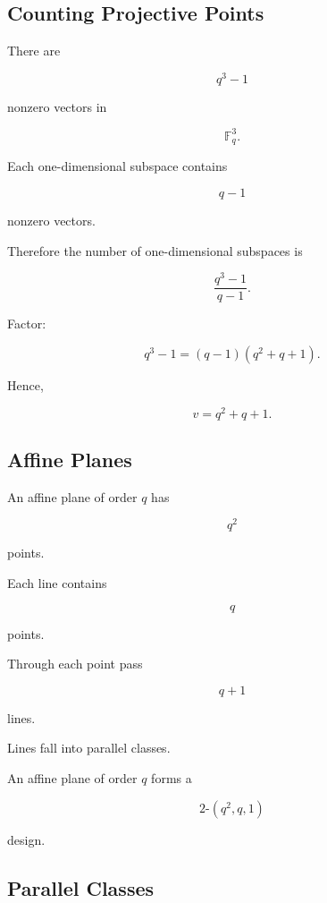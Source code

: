 \subsection{Counting Projective Points}
\label{subsec:counting-projective-points}

There are

\[
q^3-1
\]

nonzero vectors in

\[
\mathbb{F}_q^3.
\]

Each one-dimensional subspace contains

\[
q-1
\]

nonzero vectors.

Therefore the number of one-dimensional subspaces is

\[
\frac{q^3-1}{q-1}.
\]

Factor:

\[
q^3-1
=
(q-1)(q^2+q+1).
\]

Hence,

\[
\boxed{
v=q^2+q+1.
}
\]

\subsection{Affine Planes}
\label{subsec:affine-planes}

An affine plane of order \(q\) has

\[
\boxed{
q^2
}
\]

points.

Each line contains

\[
q
\]

points.

Through each point pass

\[
q+1
\]

lines.

Lines fall into parallel classes.

An affine plane of order \(q\) forms a

\[
\boxed{
2\text{-}(q^2,q,1)
}
\]

design.

\subsection{Parallel Classes}
\label{subsec:parallel-classes}

